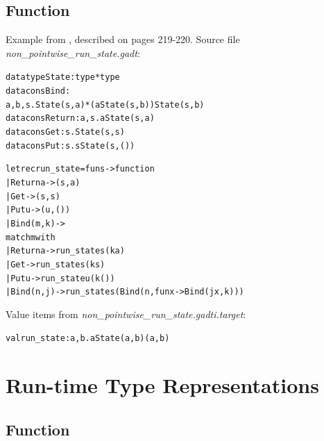 \documentclass{article}
\newcommand{\tmem}[1]{{\em #1\/}}
\newcommand{\tmverbatim}[1]{{\ttfamily{#1}}}
\newenvironment{tmcode}[1][]{\begin{alltt}}{\end{alltt}}
\begin{document}
\subsection{Function \tmverbatim{run\_state}}

Example from {\cite{PracticalGADTsInfer}}, described on pages 219-220. Source
file {\tmem{non\_pointwise\_run\_state.gadt}}:
\begin{tmcode}
datatype State : type * type
datacons Bind :
  a, b, s. State (s, a) * (a  State (s, b))  State (s, b)
datacons Return : a, s. a  State (s, a)
datacons Get : s. State (s, s)
datacons Put : s. s  State (s, ())

let rec run_state = fun s -> function
  | Return a -> (s, a)
  | Get -> (s, s)
  | Put u -> (u, ())
  | Bind (m, k) ->
    match m with
      | Return a -> run_state s (k a)
      | Get -> run_state s (k s)
      | Put u -> run_state u (k ())
      | Bind (n, j) -> run_state s (Bind (n, fun x -> Bind (j x, k)))
\end{tmcode}
Value items from {\tmem{non\_pointwise\_run\_state.gadti.target}}:
\begin{tmcode}
val run_state : a, b. a  State (a, b)  (a, b)
\end{tmcode}

\section{Run-time Type Representations}

\subsection{Function \tmverbatim{eval}}
\end{document}
